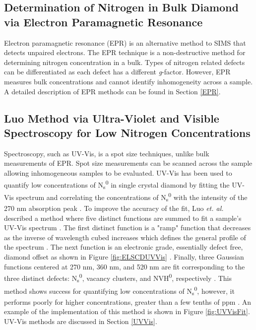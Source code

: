 \subsection{Determination of Nitrogen in Bulk Diamond via Electron Paramagnetic Resonance}
\indent

Electron paramagnetic resonance (EPR) is an alternative method to SIMS that detects unpaired electrons. The EPR technique is a non-destructive method for determining nitrogen concentration in a bulk. Types of nitrogen related defects can be differentiated as each defect has a different \textit{g}-factor. However, EPR measures bulk concentrations and cannot identify inhomogeneity across a sample. A detailed description of EPR methods can be found in Section \ref{EPR}.

\subsection{Luo Method via Ultra-Violet and Visible Spectroscopy for Low Nitrogen Concentrations}
\indent

Spectroscopy, such as UV-Vis, is a spot size techniques, unlike bulk measurements of EPR. Spot size measurements can be scanned across the sample allowing inhomogeneous samples to be evaluated. UV-Vis has been used to quantify low concentrations of N\textsubscript{s}\textsuperscript{0} in single crystal diamond by fitting the UV-Vis spectrum and correlating the concentrations of N\textsubscript{s}\textsuperscript{0} with the intensity of the 270 nm absorption peak \cite{Luo2022RapidSpectroscopy}. To improve the accuracy of the fit, Luo \textit{et. al.} described a method where five distinct functions are summed to fit a sample's UV-Vis spectrum \cite{Luo2022RapidSpectroscopy}. The first distinct function is a "ramp" function that decreases as the inverse of wavelength cubed increases which defines the general profile of the spectrum \cite{Khan2013Colour-causingDiamond}. The next function is an electronic grade, essentially defect free, diamond offset as shown in Figure \ref{fig:ELSCDUVVis} \cite{Luo2022RapidSpectroscopy}. Finally, three Gaussian functions centered at 270 nm, 360 nm, and 520 nm are fit corresponding to the three distinct defects: N\textsubscript{s}\textsuperscript{0}, vacancy clusters, and NVH\textsuperscript{0}, respectively \cite{Luo2022RapidSpectroscopy}. This method shows success for quantifying low concentrations of N\textsubscript{s}\textsuperscript{0}, however, it performs poorly for higher concentrations, greater than a few tenths of ppm \cite{Chrenko1971DispersedDiamonds}. An example of the implementation of this method is shown in Figure \ref{fig:UVVisFit}. UV-Vis methods are discussed in Section \ref{UVVis}.

